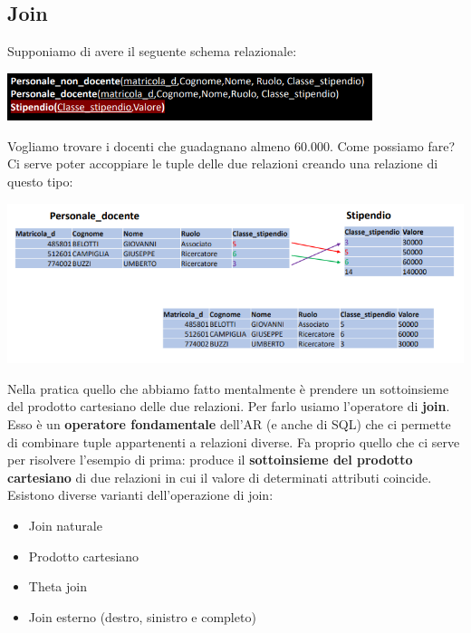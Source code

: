 \documentclass[12pt]{article}
\begin{document}
\subsection{Join}
Supponiamo di avere il seguente schema relazionale:
\begin{center}
    \includegraphics[width =0.80\textwidth]{Images/138.PNG}
\end{center}
Vogliamo trovare i docenti che guadagnano almeno 60.000.
Come possiamo fare?
Ci serve poter accoppiare le tuple delle due relazioni creando una relazione di questo tipo:
\begin{center}
    \includegraphics[width =1\textwidth]{Images/139.PNG}
\end{center}
Nella pratica quello che abbiamo fatto mentalmente è prendere un sottoinsieme del prodotto cartesiano delle due relazioni.
Per farlo usiamo l'operatore di \textbf{join}.
Esso è un \textbf{operatore fondamentale} dell'AR (e anche di SQL) che ci permette di combinare tuple appartenenti a relazioni diverse.
Fa proprio quello che ci serve per risolvere l'esempio di prima: produce il \textbf{sottoinsieme del prodotto cartesiano} di due relazioni in cui il valore di determinati attributi coincide.
Esistono diverse varianti dell'operazione di join:
\begin{itemize}
    \item Join naturale
    \item Prodotto cartesiano
    \item Theta join
    \item Join esterno (destro, sinistro e completo)
\end{itemize}
\end{document}
